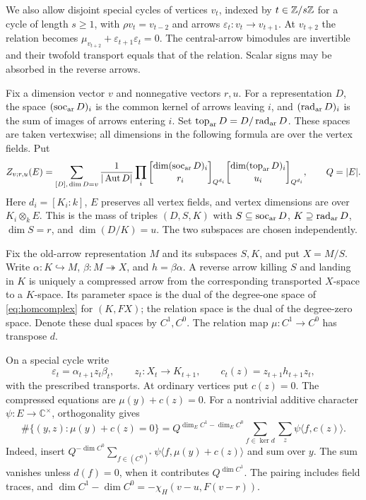 We also allow disjoint special cycles of vertices $v_t$, indexed by $t\in\mathbb Z/s\mathbb Z$ for a cycle of length $s\ge1$, with $\rho v_t=v_{t-2}$ and arrows $\varepsilon_t:v_t\to v_{t+1}$. At $v_{t+2}$ the relation becomes
$\mu_{v_{t+2}}+\varepsilon_{t+1}\varepsilon_t=0$.
The central-arrow bimodules are invertible and their twofold transport equals that of the relation. Scalar signs may be absorbed in the reverse arrows.

Fix a dimension vector $v$ and nonnegative vectors $r,u$. For a representation $D$, the space $(\operatorname{soc}_{\rm ar}D)_i$ is the common kernel of arrows leaving $i$, and $(\operatorname{rad}_{\rm ar}D)_i$ is the sum of images of arrows entering $i$. Set $\operatorname{top}_{\rm ar}D=D/\operatorname{rad}_{\rm ar}D$. These spaces are taken vertexwise; all dimensions in the following formula are over the vertex fields. Put
\begin{equation}\label{eq:moment}
 Z_{v;r,u}(E)=\sum_{[D],\,\dim D=v}\frac1{|\Aut D|}
 \prod_i\gauss{\dim(\soc_{\rm ar}D)_i}{r_i}{Q^{d_i}}
 \gauss{\dim(\topm_{\rm ar}D)_i}{u_i}{Q^{d_i}},
 \qquad Q=|E|.
\end{equation}
Here $d_i=[K_i:k]$, $E$ preserves all vertex fields, and vertex dimensions are over $K_i\otimes_kE$. This is the mass of triples $(D,S,K)$ with $S\subseteq\operatorname{soc}_{\rm ar}D$, $K\supseteq\operatorname{rad}_{\rm ar}D$, $\dim S=r$, and $\dim(D/K)=u$. The two subspaces are chosen independently.

Fix the old-arrow representation $M$ and its subspaces $S,K$, and put $X=M/S$. Write $\alpha:K\hookrightarrow M$, $\beta:M\twoheadrightarrow X$, and $h=\beta\alpha$. A reverse arrow killing $S$ and landing in $K$ is uniquely a compressed arrow from the corresponding transported $X$-space to a $K$-space. Its parameter space is the dual of the degree-one space of \eqref{eq:homcomplex} for $(K,FX)$; the relation space is the dual of the degree-zero space. Denote these dual spaces by $C^1,C^0$. The relation map $\mu:C^1\to C^0$ has transpose $d$.

On a special cycle write
\[
 \varepsilon_t=\alpha_{t+1}z_t\beta_t,\qquad
 z_t:X_t\to K_{t+1},\qquad c_t(z)=z_{t+1}h_{t+1}z_t,
\]
with the prescribed transports. At ordinary vertices put $c(z)=0$. The compressed equations are $\mu(y)+c(z)=0$. For a nontrivial additive character $\psi:E\to\mathbb C^\times$, orthogonality gives
\begin{equation}\label{eq:fourierexact}
 \#\{(y,z):\mu(y)+c(z)=0\}
 =Q^{\dim_EC^1-\dim_EC^0}
 \sum_{f\in\ker d}\sum_z\psi\langle f,c(z)\rangle .
\end{equation}
Indeed, insert $Q^{-\dim C^0}\sum_{f\in(C^0)^*}\psi\langle f,\mu(y)+c(z)\rangle$ and sum over $y$. The sum vanishes unless $d(f)=0$, when it contributes $Q^{\dim C^1}$. The pairing includes field traces, and
$\dim C^1-\dim C^0=-\chi_H(v-u,F(v-r))$.

